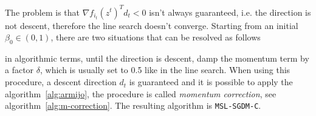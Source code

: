 The problem is that $\nabla f_{i_t}(z^t)^Td_t<0$ isn't always guaranteed, i.e. the direction is not descent, therefore the line search doesn't converge. Starting from an initial $\beta_0\in(0,1)$, there are two situations that can be resolved as follows
\begin{center}
\end{center}
in algorithmic terms, until the direction is descent, damp the momentum term by a factor $\delta$, which is usually set to \num{0.5} like in the line search. When using this procedure, a descent direction $d_t$ is guaranteed and it is possible to apply the algorithm~\ref{alg:armijo}, the procedure is called \emph{momentum correction}, see algorithm~\vref{alg:m-correction}. The resulting algorithm is \texttt{MSL-SGDM-C}.\par\smallskip

